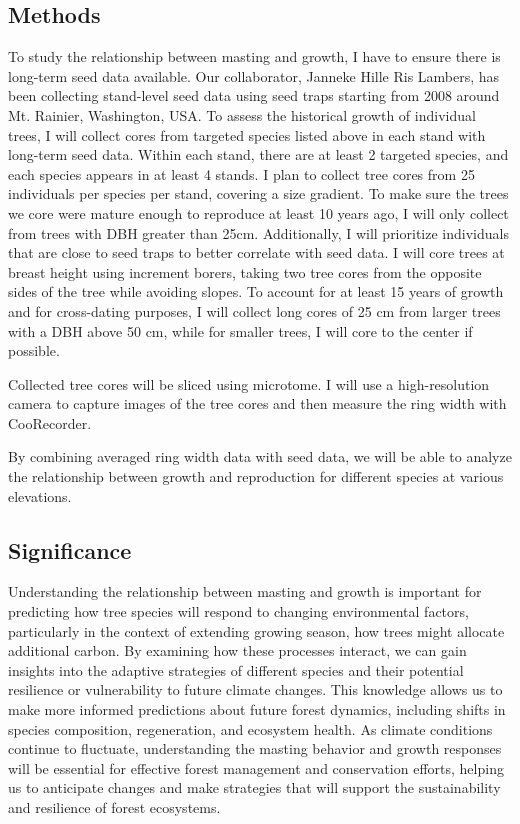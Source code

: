 \documentclass[11pt,letter]{article}
\begin{document}
\subsection{Methods}

To study the relationship between masting and growth, I have to ensure there is long-term seed data available. Our collaborator, Janneke Hille Ris Lambers, has been collecting stand-level seed data using seed traps starting from 2008 around Mt. Rainier, Washington, USA. To assess the historical growth of individual trees, I will collect cores from targeted species listed above in each stand with long-term seed data. Within each stand, there are at least 2 targeted species, and each species appears in at least 4 stands. I plan to collect tree cores from 25 individuals per species per stand, covering a size gradient. To make sure the trees we core were mature enough to reproduce at least 10 years ago, I will only collect from trees with DBH greater than 25cm. Additionally, I will prioritize individuals that are close to seed traps to better correlate with seed data. I will core trees at breast height using increment borers, taking two tree cores from the opposite sides of the tree while avoiding slopes. To account for at least 15 years of growth and for cross-dating purposes, I will collect long cores of 25 cm from larger trees with a DBH above 50 cm, while for smaller trees, I will core to the center if possible.

Collected tree cores will be sliced using microtome. I  will use a high-resolution camera to capture images of the tree cores and then measure the ring width with CooRecorder.

By combining averaged ring width data with seed data, we will be able to analyze the relationship between growth and reproduction for different species at various elevations.

\subsection{Significance}
Understanding the relationship between masting and growth is important for predicting how tree species will respond to changing environmental factors, particularly in the context of extending growing season, how trees might allocate additional carbon. By examining how these processes interact, we can gain insights into the adaptive strategies of different species and their potential resilience or vulnerability to future climate changes. This knowledge allows us to make more informed predictions about future forest dynamics, including shifts in species composition, regeneration, and ecosystem health. As climate conditions continue to fluctuate, understanding the  masting behavior and growth responses will be essential for effective forest management and conservation efforts, helping us to anticipate changes and make strategies that will support the sustainability and resilience of forest ecosystems.
\end{document}
